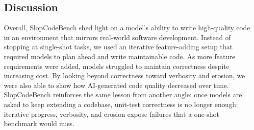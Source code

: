 \subsection{Discussion}
Overall, SlopCodeBench shed light on a model's ability to write high-quality code in an environment
that mirrors real-world software development. Instead of stopping at single-shot tasks, we used an
iterative feature-adding setup that required models to plan ahead and write maintainable code. As more
feature requirements were added, models struggled to maintain correctness despite increasing cost.
By looking beyond correctness toward verbosity and erosion, we were also able to show how AI-generated
code quality decreased over time. SlopCodeBench reinforces the same lesson from another angle: once
models are asked to keep extending a codebase, unit-test correctness is no longer enough; iterative
progress, verbosity, and erosion expose failures that a one-shot benchmark would miss.
